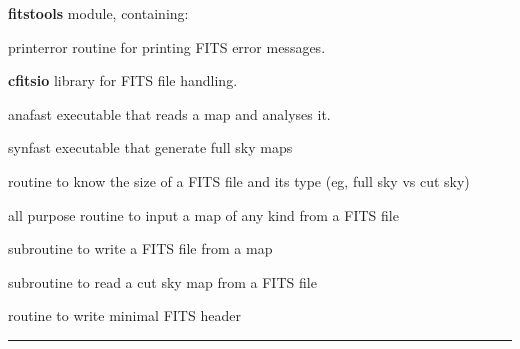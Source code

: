 \newpage
\begin{modules}
  \begin{sulist}{} %
  \item[\textbf{fitstools}] module, containing:
  \item[printerror] routine for printing FITS error messages.
  \item[\textbf{cfitsio}] library for FITS file handling.		
  \end{sulist}
\end{modules}

\begin{related}
  \begin{sulist}{} %
  \item[anafast] executable that reads a \healpix map and analyses it. 
  \item[synfast] executable that generate full sky \healpix maps
  \item[\htmlref{getsize\_fits}{sub:getsize_fits}] routine to know the size of a FITS file and its type (eg, full sky vs cut sky)
  \item[\htmlref{input\_map}{sub:input_map}] all purpose routine to input a map of any kind from a FITS file
  \item[\htmlref{output\_map}{sub:output_map}] subroutine to write a FITS file from a \healpix map
  \item[\htmlref{read\_fits\_cut4}{sub:read_fits_cut4}] subroutine to read a \healpix cut sky map from a FITS file
  \item[\htmlref{write\_minimal\_header}{sub:write_minimal_header}] routine to write minimal FITS header
  \end{sulist}
\end{related}

\rule{\hsize}{2mm}

\newpage
